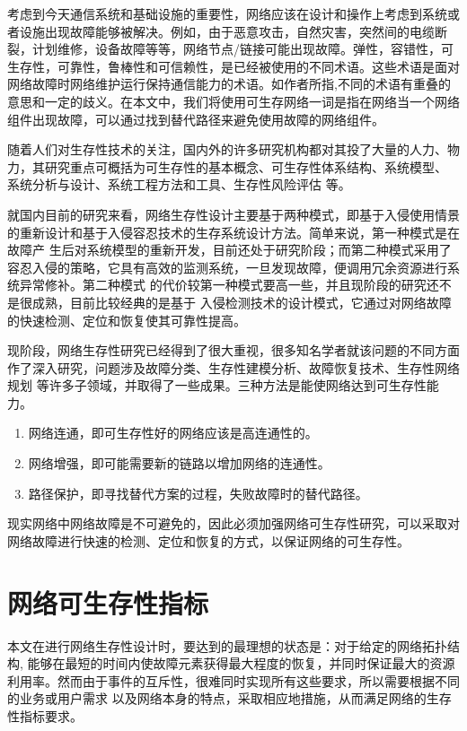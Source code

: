 考虑到今天通信系统和基础设施的重要性，网络应该在设计和操作上考虑到系统或者设施出现故障能够被解决。例如，由于恶意攻击，自然灾害，突然间的电缆断裂，计划维修，设备故障等等，网络节点/链接可能出现故障。弹性，容错性，可生存性，可靠性，鲁棒性和可信赖性，是已经被使用的不同术语。这些术语是面对网络故障时网络维护运行保持通信能力的术语。如作者\cite{al2009comparative}所指,不同的术语有重叠的意思和一定的歧义。在本文中，我们将使用可生存网络一词是指在网络当一个网络组件出现故障，可以通过找到替代路径来避免使用故障的网络组件。

随着人们对生存性技术的关注，国内外的许多研究机构都对其投了大量的人力、物 力，其研究重点可概括为可生存性的基本概念\cite{kuipers2012overview}、可生存性体系结构、系统模型\cite{luxinhua2006}、 系统分析与设计、系统工程方法和工具、生存性风险评估\cite{linxuegang2006} 等。


就国内目前的研究来看，网络生存性设计主要基于两种模式\cite{hanjianjun2007}，即基于入侵使用情景 的重新设计和基于入侵容忍技术的生存系统设计方法。简单来说，第一种模式是在故障产 生后对系统模型的重新开发，目前还处于研究阶段；而第二种模式采用了容忍入侵的策略，它具有高效的监测系统，一旦发现故障，便调用冗余资源进行系统异常修补。第二种模式 的代价较第一种模式要高一些，并且现阶段的研究还不是很成熟，目前比较经典的是基于 入侵检测技术的设计模式，它通过对网络故障的快速检测、定位和恢复使其可靠性提高。

现阶段，网络生存性研究已经得到了很大重视，很多知名学者就该问题的不同方面作了深入研究，问题涉及故障分类、生存性建模分析、故障恢复技术、生存性网络规划 等许多子领域，并取得了一些成果。三种方法是能使网络达到可生存性能力。
\begin{enumerate}
\item 网络连通，即可生存性好的网络应该是高连通性的。
\item 网络增强，即可能需要新的链路以增加网络的连通性。
\item 路径保护，即寻找替代方案的过程，失败故障时的替代路径。
\end{enumerate}


现实网络中网络故障是不可避免的，因此必须加强网络可生存性研究，可以采取对网络故障进行快速的检测、定位和恢复的方式，以保证网络的可生存性。

\section{网络可生存性指标}
本文在进行网络生存性设计时，要达到的最理想的状态是：对于给定的网络拓扑结构, 能够在最短的时间内使故障元素获得最大程度的恢复，并同时保证最大的资源利用率。然而由于事件的互斥性，很难同时实现所有这些要求，所以需要根据不同的业务或用户需求 以及网络本身的特点，采取相应地措施，从而满足网络的生存性指标要求。

